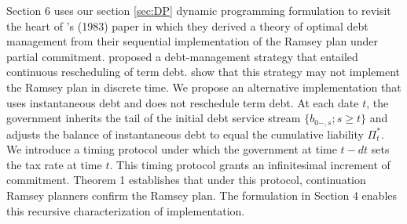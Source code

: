\documentclass[12pt]{article}
\begin{document}
{Section 6 uses our section \ref{sec:DP} dynamic programming formulation to revisit the heart of \citeauthor{LucasStokey1983}'s (1983) paper in which they derived a theory of optimal debt management from their  sequential  implementation of the Ramsey plan under partial commitment. \cite{LucasStokey1983} proposed a debt-management strategy that entailed continuous rescheduling of term debt. \cite*{debortoli2021optimal} show that this strategy may not implement the Ramsey plan in discrete time. We propose an alternative implementation that uses instantaneous debt and does not reschedule term debt. At each date $t$, the government inherits the tail of the initial debt service stream $\{b_{0-,s}; s \geq t\}$ and adjusts the balance of instantaneous debt to equal the cumulative liability $\Pi_t^*$. We introduce a timing protocol under which the government at time $t-dt$ sets the tax rate at time $t$. This timing protocol grants an infinitesimal increment of commitment. Theorem 1 establishes that under this protocol, continuation Ramsey planners confirm the Ramsey plan. The  formulation in Section 4 enables this recursive characterization of implementation.


}
\end{document}
